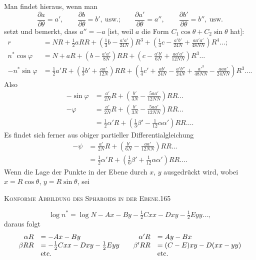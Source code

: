 Man findet hieraus, wenn man
\[
\frac{\partial a}{\partial\theta}=a',\qquad\frac{\partial b}{\partial\theta}=b',\ \text{usw.;}\qquad
\frac{\partial a'}{\partial\theta}=a'',\qquad\frac{\partial b'}{\partial\theta}=b'',\ \text{usw.}
\]
setzt und bemerkt, dass $a''=-a$ [ist, weil $a$ die Form $C_1\cos\theta+C_2\sin\theta$ hat]:
\[
\begin{aligned}
r&=NR+\tfrac12aRR+\left(\tfrac13b-\frac{a'a'}{24N}\right)R^3+\left(\tfrac14c-\frac{a'b'}{24N}+\frac{aa'a'}{48NN}\right)R^4\ldots;\\
n^*\cos\varphi&=N+aR+\left(b-\frac{a'a'}{8N}\right)RR+\left(c-\frac{a'b'}{6N}+\frac{aa'a'}{12NN}\right)R^3\ldots\\
-n^*\sin\varphi&=\tfrac12a'R+\left(\tfrac13b'+\frac{aa'}{12N}\right)RR
+\left(\tfrac14c'+\frac{ab'}{24N}-\frac{a'b''}{24N}+\frac{{a'}^3}{48NN}-\frac{aaa'}{24NN}\right)R^3\ldots.
\end{aligned}
\]
Also
\[
\begin{aligned}
-\sin\varphi&=\frac{a'}{2N}R+\left(\frac{b'}{3N}-\frac{5aa'}{12NN}\right)RR\ldots\\
-\varphi&=\frac{a'}{2N}R+\left(\frac{b'}{3N}-\frac{5aa'}{12NN}\right)RR\ldots\\
&=\tfrac12\alpha'R+\left(\tfrac13\beta'-\tfrac1{12}\alpha\alpha'\right)RR\ldots.
\end{aligned}
\]
Es findet sich ferner aus obiger partieller Differentialgleichung
\[
\begin{aligned}
-\psi&=\frac{a'}{2N}R+\left(\frac{b'}{6N}-\frac{aa'}{12NN}\right)RR\ldots\\
&=\tfrac12\alpha'R+\left(\tfrac16\beta'+\tfrac1{12}\alpha\alpha'\right)RR\ldots.
\end{aligned}
\]
Wenn die Lage der Punkte in der Ebene durch $x$, $y$ ausgedrückt wird, wobei $x=R\cos\theta$, $y=R\sin\theta$, sei
\par\endgroup
\clearpage
\noindent\mbox{}\hfill\textsc{Konforme Abbildung des Sphäroids in der Ebene.}\hfill165\par\medskip
\begingroup\small
\[
\log n^*=\log N-Ax-By-\tfrac12Cxx-Dxy-\tfrac12Eyy\ldots,
\]
daraus folgt
\[
\begin{array}{rl@{\qquad}rl}
\alpha R&=-Ax-By&\alpha'R&=Ay-Bx\\
\beta RR&=-\tfrac12Cxx-Dxy-\tfrac12Eyy&\beta'RR&=(C-E)xy-D(xx-yy)\\
&\text{etc.}&&\text{etc.}
\end{array}
\]
